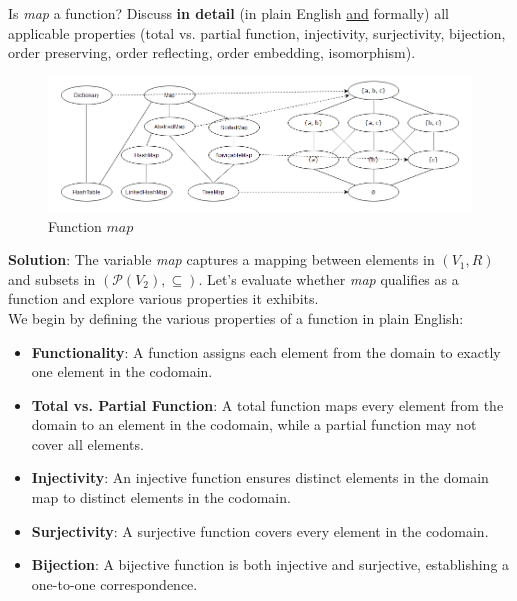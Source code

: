 \documentclass[12pt]{article}
\begin{document}
\begin{spacing}{1.5}
	\noindent Is \textit{map} a function? Discuss \textbf{in detail} (in plain English \uline{and} formally) all applicable properties (total vs. partial function, injectivity, surjectivity, bijection, order preserving, order reflecting, order embedding, isomorphism).\\
		
	\begin{figure}[htp]
		\centering
		\includegraphics[width=1.1\textwidth]{static/FunctionMapping_6_3.png}
		\caption{Function $map$}
		\label{fig:figure}
	\end{figure}
		
	\noindent \textbf{Solution}: The variable \textit{map} captures a mapping between elements in $(V_1, R)$ and subsets in $(\mathcal{P}(V_2), \subseteq)$. Let's evaluate whether \textit{map} qualifies as a function and explore various properties it exhibits.\\
		
	\noindent We begin by defining the various properties of a function in plain English:
		
	\begin{itemize}
		\item \textbf{Functionality}: A function assigns each element from the domain to exactly one element in the codomain.
		      		              
		\item \textbf{Total vs. Partial Function}: A total function maps every element from the domain to an element in the codomain, while a partial function may not cover all elements.
		      		          
		\item \textbf{Injectivity}: An injective function ensures distinct elements in the domain map to distinct elements in the codomain.
		      		          
		\item \textbf{Surjectivity}: A surjective function covers every element in the codomain.
		      		          
		\item \textbf{Bijection}: A bijective function is both injective and surjective, establishing a one-to-one correspondence.
		      		          

\end{itemize}
\end{spacing}
\end{document}
